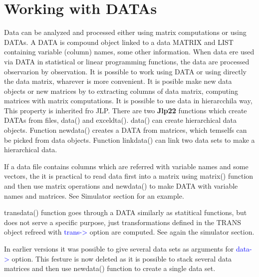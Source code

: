 \section{Working with DATAs}
\label{datahead}
Data can be analyzed and processed either using matrix computations
or using DATAs. A DATA is compound object
linked to a data MATRIX and LIST containing variable (column) names,
some other information.
When data ere used via DATA in statistical or linear programming
functions, the data are processed observarion by observation.
It is possible to work using DATA or using directly the data matrix, wharever is more
convenient. It is posible make new data objects or new matrices
by to extracting  columns of data matrix, computing matrices with matrix computations.
It is possible to use data in hierarcchila way, This property is inherited fro JLP.
There are two \textbf{Jlp22} functions which create DATAs from files, \textcolor{VioletRed}{data}() and
exceldta(). \textcolor{VioletRed}{data}() can create hierarchical data objects. Function \textcolor{VioletRed}{newdata}() creates a DATA from matrices, which temselfs can be
picked from data objects. Function \textcolor{VioletRed}{linkdata}() can link two data sets to make a hierarchical data.
\begin{note}
If a data file contains columns which are referred with variable names and some vectors,
the it is practical to read data first into a matrix using \textcolor{VioletRed}{matrix}() function and then
use matrix operations and \textcolor{VioletRed}{newdata}() to make DATA with variable names and matrices.
See Simulator section for an example.
\end{note}
\begin{note}
\textcolor{VioletRed}{transdata}() function goes through a DATA similarly as statitical functions, but
does not serve a specific purpose, just transformations defined in the TRANS object refreed with
\textcolor{blue}{trans->} option are computed. See again the simulator section.
\end{note}
\begin{note}
In earlier versions it was possible to give several data sets as arguments for \textcolor{blue}{data->} option.
This festure is now deleted as it is possible to stack several data matrices and then use \textcolor{VioletRed}{newdata}() function to create a single data set.
\end{note}
